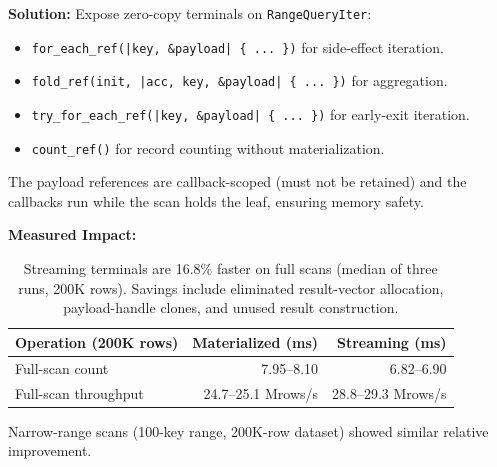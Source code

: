 \documentclass[11pt]{article}
\newcommand{\code}[1]{\texttt{#1}}
\begin{document}
\textbf{Solution:}
Expose zero-copy terminals on \code{RangeQueryIter}:

\begin{itemize}
  \item \code{for\_each\_ref(|key, \&payload| \{ ... \})} for side-effect iteration.
  \item \code{fold\_ref(init, |acc, key, \&payload| \{ ... \})} for aggregation.
  \item \code{try\_for\_each\_ref(|key, \&payload| \{ ... \})} for early-exit
        iteration.
  \item \code{count\_ref()} for record counting without materialization.
\end{itemize}

The payload references are callback-scoped (must not be retained) and the callbacks
run while the scan holds the leaf, ensuring memory safety.

\textbf{Measured Impact:}

\begin{table}[h]
\centering
\small
\begin{tabular}{lrr}
\toprule
\textbf{Operation (200K rows)} & \textbf{Materialized (ms)} & \textbf{Streaming (ms)} \\
\midrule
Full-scan count & 7.95--8.10 & 6.82--6.90 \\
Full-scan throughput & 24.7--25.1 Mrows/s & 28.8--29.3 Mrows/s \\
\bottomrule
\end{tabular}
\caption{Streaming terminals are 16.8\% faster on full scans (median of three runs,
200K rows). Savings include eliminated result-vector allocation, payload-handle clones,
and unused result construction.}
\label{tab:streaming}
\end{table}

Narrow-range scans (100-key range, 200K-row dataset) showed similar relative improvement.
\end{document}
